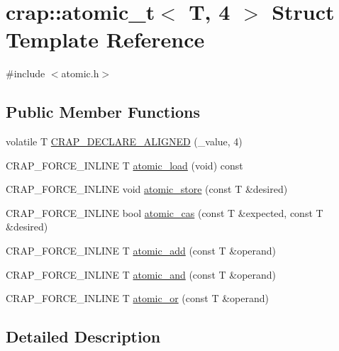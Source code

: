 \hypertarget{structcrap_1_1atomic__t_3_01_t_00_014_01_4}{\section{crap\+:\+:atomic\+\_\+t$<$ T, 4 $>$ Struct Template Reference}
\label{structcrap_1_1atomic__t_3_01_t_00_014_01_4}
}


{\ttfamily \#include $<$atomic.\+h$>$}

\subsection*{Public Member Functions}
\begin{DoxyCompactItemize}
\item 
volatile T \hyperlink{structcrap_1_1atomic__t_3_01_t_00_014_01_4_ad923627de05971be07214c919cca097f}{C\+R\+A\+P\+\_\+\+D\+E\+C\+L\+A\+R\+E\+\_\+\+A\+L\+I\+G\+N\+E\+D} (\+\_\+value, 4)
\item 
C\+R\+A\+P\+\_\+\+F\+O\+R\+C\+E\+\_\+\+I\+N\+L\+I\+N\+E T \hyperlink{structcrap_1_1atomic__t_3_01_t_00_014_01_4_a05cd1e73cc789c884b7221b4a977259c}{atomic\+\_\+load} (void) const 
\item 
C\+R\+A\+P\+\_\+\+F\+O\+R\+C\+E\+\_\+\+I\+N\+L\+I\+N\+E void \hyperlink{structcrap_1_1atomic__t_3_01_t_00_014_01_4_aab85d666e2e165c3ce0e0ea7320e22dd}{atomic\+\_\+store} (const T \&desired)
\item 
C\+R\+A\+P\+\_\+\+F\+O\+R\+C\+E\+\_\+\+I\+N\+L\+I\+N\+E bool \hyperlink{structcrap_1_1atomic__t_3_01_t_00_014_01_4_aad6c59f8883b0675d44914020e7817cd}{atomic\+\_\+cas} (const T \&expected, const T \&desired)
\item 
C\+R\+A\+P\+\_\+\+F\+O\+R\+C\+E\+\_\+\+I\+N\+L\+I\+N\+E T \hyperlink{structcrap_1_1atomic__t_3_01_t_00_014_01_4_a598ca4c5dc29306e7548178aa7579668}{atomic\+\_\+add} (const T \&operand)
\item 
C\+R\+A\+P\+\_\+\+F\+O\+R\+C\+E\+\_\+\+I\+N\+L\+I\+N\+E T \hyperlink{structcrap_1_1atomic__t_3_01_t_00_014_01_4_ae83c19e03fc08a4d4b896a0c7552fc67}{atomic\+\_\+and} (const T \&operand)
\item 
C\+R\+A\+P\+\_\+\+F\+O\+R\+C\+E\+\_\+\+I\+N\+L\+I\+N\+E T \hyperlink{structcrap_1_1atomic__t_3_01_t_00_014_01_4_a1366f6e699395e13ee114610b910fb51}{atomic\+\_\+or} (const T \&operand)
\end{DoxyCompactItemize}


\subsection{Detailed Description}
